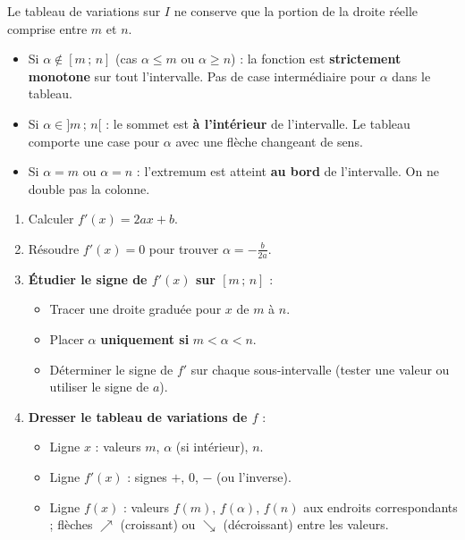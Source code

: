 \documentclass[11pt]{article}
\begin{document}
\begin{attention}[{Restriction à l'intervalle $I=[m\,;\,n]$}]
Le tableau de variations sur $I$ ne conserve que la portion de la droite réelle comprise entre $m$ et $n$.
\begin{itemize}
    \item Si $\alpha \notin [m\,;\,n]$ (cas $\alpha \le m$ ou $\alpha \ge n$) : la fonction est \textbf{strictement monotone} sur tout l'intervalle. Pas de case intermédiaire pour $\alpha$ dans le tableau.
    \item Si $\alpha \in ]m\,;\,n[$ : le sommet est \textbf{à l'intérieur} de l'intervalle. Le tableau comporte une case pour $\alpha$ avec une flèche changeant de sens.
    \item Si $\alpha = m$ ou $\alpha = n$ : l'extremum est atteint \textbf{au bord} de l'intervalle. On ne double pas la colonne.
\end{itemize}
\end{attention}

\begin{methode}[{Construction du tableau de variations sur $I=[m\,;\,n]$}]
\begin{enumerate}
    \item Calculer $f'(x) = 2ax+b$.
    \item Résoudre $f'(x)=0$ pour trouver $\alpha = -\frac{b}{2a}$.
    \item \textbf{Étudier le signe de $f'(x)$ sur $[m\,;\,n]$} : 
          \begin{itemize}
              \item Tracer une droite graduée pour $x$ de $m$ à $n$.
              \item Placer $\alpha$ \textbf{uniquement si} $m < \alpha < n$.
              \item Déterminer le signe de $f'$ sur chaque sous-intervalle (tester une valeur ou utiliser le signe de $a$).
          \end{itemize}
    \item \textbf{Dresser le tableau de variations de $f$} :
          \begin{itemize}
              \item Ligne $x$ : valeurs $m$, $\alpha$ (si intérieur), $n$.
              \item Ligne $f'(x)$ : signes $+$, $0$, $-$ (ou l'inverse).
              \item Ligne $f(x)$ : valeurs $f(m)$, $f(\alpha)$, $f(n)$ aux endroits correspondants ; flèches $\nearrow$ (croissant) ou $\searrow$ (décroissant) entre les valeurs.
          \end{itemize}
\end{enumerate}
\end{methode}
\end{document}
